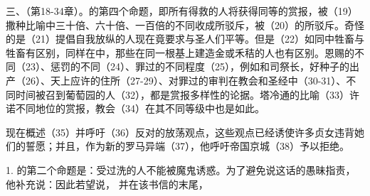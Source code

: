 三、（第18-34章）。的第四个命题，即所有得救的人将获得同等的赏报，被（19）撒种比喻中三十倍、六十倍、一百倍的不同收成所驳斥，被（20）的所驳斥。奇怪的是（21）提倡自我放纵的人现在竟要求与圣人们平等。但是（22）如同中牲畜与牲畜有区别，同样在中，那些在同一根基上建造金或禾秸的人也有区别。恩赐的不同（23）、惩罚的不同（24）、罪过的不同程度（25），例如和司祭长，好种子的出产（26）、天上应许的住所（27-29）、对罪过的审判在教会和圣经中（30-31）、不同时间被召到葡萄园的人（32），都是赏报多样性的论据。塔冷通的比喻（33）许诺不同地位的赏报，教会（34）在其不同等级中也是如此。\par

现在概述（35）并呼吁（36）反对的放荡观点，这些观点已经诱使许多贞女违背她们的誓愿；并且，作为新的罗马异端（37），他呼吁帝国京城（38）予以拒绝。\par

1. 的第二个命题是：受过洗的人不能被魔鬼诱惑。为了避免说这话的愚昧指责，他补充说：因此若望说， 并在该书信的末尾， \par

